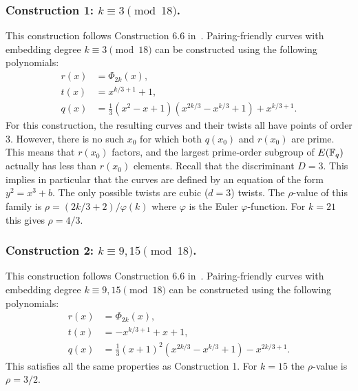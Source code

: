 
\subsubsection{Construction 1: $k \equiv 3 \pmod{18}$.}
\label{con1}

This construction follows {Construction 6.6} in~\cite{2010/freeman}.
Pairing-friendly curves with embedding degree $k \equiv 3 \pmod{18}$
can be constructed using the following polynomials:
\begin{align*}
r(x) &= \Phi_{2k}(x),	\\
t(x) &= x^{k/3+1} + 1,	\\
q(x) &= \frac{1}{3} (x^2 - x + 1) (x^{2k/3} - x^{k/3} + 1) + x^{k/3+1}.
\end{align*}
For this construction,
the resulting curves and their twists all have points of order 3.
However, there is no such $x_0$ for which
both $q(x_0)$ and $r(x_0)$ are prime.
This means that $r(x_0)$ factors, and the largest prime-order subgroup of $E(\mathbb{F}_{q})$ actually has less than $r(x_0)$ elements.
Recall that the discriminant $D = 3$. 
This implies in particular that the curves are defined by an equation of the form $y^2 = x^3 + b$.
The only possible twists are cubic ($d=3$) twists.
The $\rho$-value of this family is $\rho = (2k/3 + 2)/\varphi(k)$ where $\varphi$ is the Euler $\varphi$-function.
For $k = 21$ this gives $\rho = 4/3$.


\subsubsection{Construction 2: $k \equiv 9,15 \pmod{18}$.}
\label{con2}

This construction follows {Construction 6.6} in~\cite{2010/freeman}.
Pairing-friendly curves with embedding degree $k \equiv 9,15 \pmod{18}$
can be constructed using the following polynomials:
\begin{align*}
r(x) &= \Phi_{2k}(x),	\\
t(x) &= -x^{k/3+1} + x + 1,	\\
q(x) &= \frac{1}{3} (x+1)^2 (x^{2k/3} - x^{k/3} + 1) - x^{2k/3+1}.
\end{align*}
This satisfies all the same properties as Construction 1.
For $k=15$ the $\rho$-value is $\rho=3/2$.

